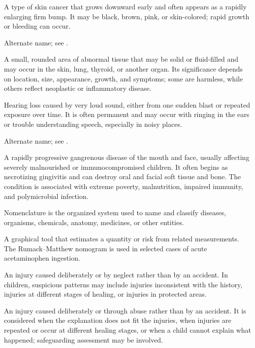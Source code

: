  A type of skin cancer that grows downward early and often appears as a rapidly enlarging firm bump. It may be black, brown, pink, or skin-colored; rapid growth or bleeding can occur.

 Alternate name; see .

 A small, rounded area of abnormal tissue that may be solid or fluid-filled and may occur in the skin, lung, thyroid, or another organ. Its significance depends on location, size, appearance, growth, and symptoms; some are harmless, while others reflect neoplastic or inflammatory disease.

 Hearing loss caused by very loud sound, either from one sudden blast or repeated exposure over time. It is often permanent and may occur with ringing in the ears or trouble understanding speech, especially in noisy places.

 Alternate name; see .

 A rapidly progressive gangrenous disease of the mouth and face, usually affecting severely malnourished or immunocompromised children. It often begins as necrotizing gingivitis and can destroy oral and facial soft tissue and bone. The condition is associated with extreme poverty, malnutrition, impaired immunity, and polymicrobial infection.

 Nomenclature is the organized system used to name and classify diseases, organisms, chemicals, anatomy, medicines, or other entities.

 A graphical tool that estimates a quantity or risk from related measurements. The Rumack–Matthew nomogram is used in selected cases of acute acetaminophen ingestion.

 An injury caused deliberately or by neglect rather than by an accident. In children, suspicious patterns may include injuries inconsistent with the history, injuries at different stages of healing, or injuries in protected areas.

 An injury caused deliberately or through abuse rather than by an accident. It is considered when the explanation does not fit the injuries, when injuries are repeated or occur at different healing stages, or when a child cannot explain what happened; safeguarding assessment may be involved.

